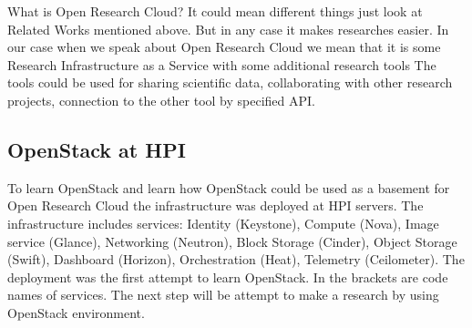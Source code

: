 What is Open Research Cloud? It could mean different things just look at Related Works mentioned above. But in any case it makes researches easier. In our case when we speak about Open Research Cloud we mean that it is some Research Infrastructure as a Service with some additional research tools The tools could be used for sharing scientific data, collaborating with other research projects, connection to the other tool by specified API. 



\subsection{OpenStack at HPI}
To learn OpenStack and learn how OpenStack could be used as a basement for Open Research Cloud the infrastructure was deployed at HPI servers. The infrastructure includes services: Identity (Keystone), Compute (Nova), Image service (Glance), Networking (Neutron), Block Storage (Cinder), Object Storage (Swift), Dashboard (Horizon), Orchestration (Heat), Telemetry (Ceilometer). The deployment was the first attempt to learn OpenStack. In the brackets are code names of services. The next step will be attempt to make a research by using OpenStack environment. 






% 
